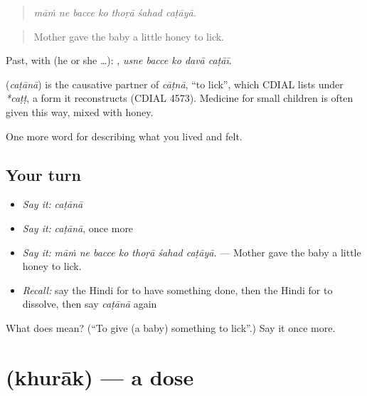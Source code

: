 \begin{quote}
      
\end{quote}

\begin{quote}
\emph{māṁ ne bacce ko thoṛā śahad caṭāyā.}
\end{quote}

\begin{quote}
Mother gave the baby a little honey to lick.
\end{quote}

Past, with  (he or she …):     , \emph{usne bacce ko davā caṭāī}.

\begin{cousinweb}
\textbf{} (\emph{caṭānā}) is the causative partner of \emph{cāṭnā}, \textquotedblleft{}to lick\textquotedblright{}, which CDIAL lists under \emph{*caṭṭ}, a form it reconstructs (CDIAL 4573). Medicine for small children is often given this way, mixed with honey.
\end{cousinweb}

\begin{grammarlens}[title={What you've built}]
One more word for describing what you lived and felt.
\end{grammarlens}

\subsection*{Your turn}
\begin{itemize}
\raggedright
  \item \emph{Say it:} \emph{caṭānā}
  \item \emph{Say it:} \emph{caṭānā}, once more
  \item \emph{Say it:} \emph{māṁ ne bacce ko thoṛā śahad caṭāyā.} — Mother gave the baby a little honey to lick.
  \item \emph{Recall:} say the Hindi for to have something done, then the Hindi for to dissolve, then say \emph{caṭānā} again
\end{itemize}

\begin{tcolorbox}[breakable,colback=teal!4,colframe=teal!35!black,title={Before you move on}]
What does  mean? (\textquotedblleft{}To give (a baby) something to lick\textquotedblright{}.) Say it once more.
\end{tcolorbox}
\section[\texorpdfstring{\hi{ख़ुराक} (khurāk)}{ख़ुराक (khurāk)}]{ (khurāk) — a dose}

